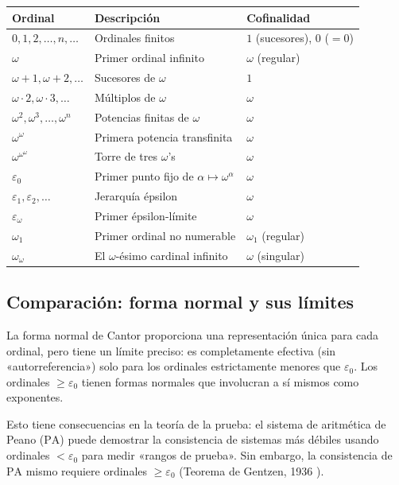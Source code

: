 \begin{center}
\renewcommand{\arraystretch}{1.6}
\begin{tabular}{lll}
\hline
\textbf{Ordinal} & \textbf{Descripción} & \textbf{Cofinalidad} \\
\hline
$0, 1, 2, \ldots, n, \ldots$ & Ordinales finitos & $1$ (sucesores), $0$ ($=0$) \\
$\omega$ & Primer ordinal infinito & $\omega$ (regular) \\
$\omega+1, \omega+2, \ldots$ & Sucesores de $\omega$ & $1$ \\
$\omega \cdot 2, \omega \cdot 3, \ldots$ & Múltiplos de $\omega$ & $\omega$ \\
$\omega^2, \omega^3, \ldots, \omega^n$ & Potencias finitas de $\omega$ & $\omega$ \\
$\omega^\omega$ & Primera potencia transfinita & $\omega$ \\
$\omega^{\omega^\omega}$ & Torre de tres $\omega$'s & $\omega$ \\
$\varepsilon_0$ & Primer punto fijo de $\alpha \mapsto \omega^\alpha$ & $\omega$ \\
$\varepsilon_1, \varepsilon_2, \ldots$ & Jerarquía épsilon & $\omega$ \\
$\varepsilon_\omega$ & Primer épsilon-límite & $\omega$ \\
$\omega_1$ & Primer ordinal no numerable & $\omega_1$ (regular) \\
$\omega_\omega$ & El $\omega$-ésimo cardinal infinito & $\omega$ (singular) \\
\hline
\end{tabular}
\end{center}

\subsection{Comparación: forma normal y sus límites}

\begin{importante}
La forma normal de Cantor proporciona una representación única para cada ordinal, pero tiene un límite preciso: es completamente efectiva (sin «autorreferencia») solo para los ordinales estrictamente menores que $\varepsilon_0$. Los ordinales $\geq \varepsilon_0$ tienen formas normales que involucran a sí mismos como exponentes.

Esto tiene consecuencias en la teoría de la prueba: el sistema de aritmética de Peano ($\mathrm{PA}$) puede demostrar la consistencia de sistemas más débiles usando ordinales $< \varepsilon_0$ para medir «rangos de prueba». Sin embargo, la consistencia de $\mathrm{PA}$ mismo requiere ordinales $\geq \varepsilon_0$ (Teorema de Gentzen, 1936 \cite{gentzen1936}).
\end{importante}

